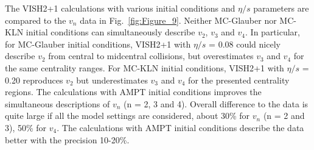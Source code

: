 The VISH2+1 calculations with various initial conditions and $\eta/s$ parameters are compared to the $v_n$ data in Fig.~\ref{fig:Figure_9}.
Neither MC-Glauber nor MC-KLN initial conditions can simultaneously describe $v_2$, $v_3$ and $v_4$. In particular, for MC-Glauber initial conditions, VISH2+1 with $\eta/s$ = 0.08 could nicely describe $v_2$ from central to midcentral collisions, but overestimates $v_3$ and $v_4$ for the same centrality ranges. For MC-KLN initial conditions, VISH2+1 with $\eta/s$ = 0.20 reproduces $v_2$ but underestimates $v_3$ and $v_4$ for the presented centrality regions. The calculations with AMPT initial conditions improves the simultaneous descriptions of $v_n$ (n = 2, 3 and 4). Overall difference to the data is quite large if all the model settings are considered, about 30\% for $v_n$ (n = 2 and 3),  50\% for $v_4$. The calculations with AMPT initial conditions describe the data better with the precision 10-20\%.

